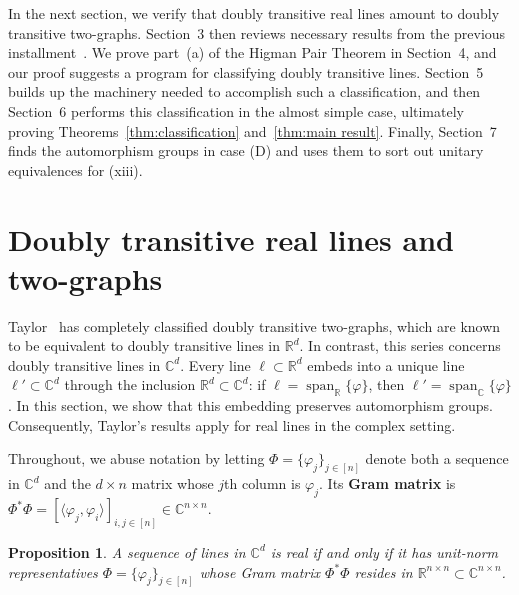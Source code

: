 \documentclass[11pt]{article}
\newtheorem{proposition}[theo]{Proposition}
\theoremstyle{definition}
\numberwithin{equation}{section}
\begin{document}
In the next section, we verify that doubly transitive real lines amount to doubly transitive two-graphs.
Section~3 then reviews necessary results from the previous installment~\cite{IversonM:18}.
We prove part~(a) of the Higman Pair Theorem in Section~4, and our proof suggests a program for classifying doubly transitive lines.
Section~5 builds up the machinery needed to accomplish such a classification, and then Section~6 performs this classification in the almost simple case, ultimately proving Theorems~\ref{thm:classification} and~\ref{thm:main result}.
Finally, Section~7 finds the automorphism groups in case (D) and uses them to sort out unitary equivalences for (xiii).

\section{
Doubly transitive real lines and two-graphs}
\label{sec:real}

Taylor~\cite{Taylor:92} has completely classified doubly transitive two-graphs, which are known to be equivalent to doubly transitive lines in $\mathbb{R}^d$.
In contrast, this series concerns doubly transitive lines in $\mathbb{C}^d$.
Every line $\ell \subset \mathbb{R}^d$ embeds into a unique line $\ell' \subset \mathbb{C}^d$ through the inclusion $\mathbb{R}^d \subset \mathbb{C}^d$: if $\ell = \operatorname{span}_{\mathbb{R}} \{ \varphi \}$, then $\ell' = \operatorname{span}_{\mathbb{C}} \{ \varphi \}$.
In this section, we show that this embedding preserves automorphism groups.
Consequently, Taylor's results apply for real lines in the complex setting.

Throughout, we abuse notation by letting $\Phi=\{\varphi_j\}_{j\in[n]}$ denote both a sequence in $\mathbb{C}^d$ and the $d\times n$ matrix whose $j$th column is $\varphi_j$.
Its \textbf{Gram matrix} is $\Phi^* \Phi = [ \langle \varphi_j, \varphi_i \rangle ]_{i,j \in [n]} \in \mathbb{C}^{n\times n}$.

\begin{proposition}
\label{prop:real lines are real}
A sequence of lines in $\mathbb{C}^d$ is real if and only if it has unit-norm representatives $\Phi = \{ \varphi_j \}_{j\in [n]}$ whose Gram matrix $\Phi^* \Phi$ resides in $\mathbb{R}^{n\times n} \subset \mathbb{C}^{n\times n}$.
\end{proposition}
\end{document}
